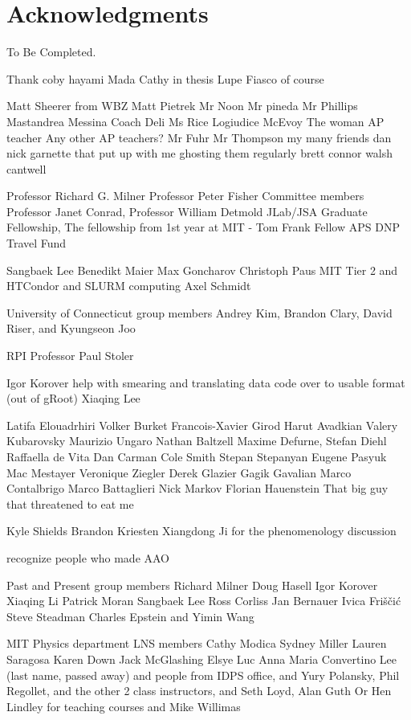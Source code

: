 \section*{Acknowledgments}

To Be Completed. 
\clearpage
\iffalse

Thank coby hayami Mada Cathy in thesis
Lupe Fiasco of course


Matt Sheerer from WBZ
Matt Pietrek
Mr Noon Mr pineda Mr Phillips
Mastandrea
Messina
Coach Deli
Ms Rice
Logiudice
McEvoy
The woman AP teacher
Any other AP teachers?
Mr Fuhr
Mr Thompson
my many friends dan nick garnette that put up with me ghosting them regularly brett connor walsh cantwell 




Professor Richard G. Milner
Professor Peter Fisher
Committee members Professor Janet Conrad, Professor William Detmold
JLab/JSA Graduate Fellowship, 
The fellowship from 1st year at MIT - Tom Frank Fellow
APS DNP Travel Fund

Sangbaek Lee
Benedikt Maier
Max Goncharov
Christoph Paus
MIT Tier 2 and HTCondor and SLURM computing
Axel Schmidt

University of Connecticut group members Andrey Kim, Brandon Clary, David Riser, and Kyungseon Joo

RPI Professor Paul Stoler


Igor Korover help with smearing and translating data code over to usable format (out of gRoot)
Xiaqing Lee

Latifa Elouadrhiri
Volker Burket
Francois-Xavier Girod
Harut Avadkian
Valery Kubarovsky
Maurizio Ungaro
Nathan Baltzell
Maxime Defurne,
Stefan Diehl
Raffaella de Vita
Dan Carman
Cole Smith
Stepan Stepanyan
Eugene Pasyuk
Mac Mestayer
Veronique Ziegler
Derek Glazier
Gagik Gavalian
Marco Contalbrigo
Marco Battaglieri
Nick Markov
Florian Hauenstein
That big guy that threatened to eat me

Kyle Shields
Brandon Kriesten
Xiangdong Ji
for the phenomenology discussion

recognize people who made AAO 

Past and Present group members
Richard Milner Doug Hasell Igor Korover Xiaqing Li Patrick Moran Sangbaek Lee Ross Corliss Jan Bernauer Ivica Friščić Steve Steadman Charles Epstein and Yimin Wang

MIT Physics department LNS members Cathy Modica Sydney Miller Lauren Saragosa Karen Down Jack McGlashing Elsye Luc Anna Maria Convertino Lee (last name, passed away) 
and people from IDPS office, and Yury Polansky, Phil Regollet, and the other 2 class instructors, and Seth Loyd, Alan Guth Or Hen Lindley for teaching courses and Mike Willimas


